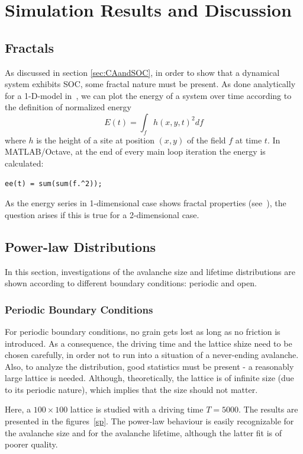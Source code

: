 \chapter{Simulation Results and Discussion}
\thispagestyle{fancy}

\section{Fractals}
As discussed in section \ref{sec:CAandSOC}, in order to show that a dynamical system exhibits SOC, some fractal nature must be present. As done analytically for a 1-D-model in~\cite{fractal_avalanching}, we can plot the energy of a system over time according to the definition of normalized energy
\[
E(t) = \int_f h(x,y,t)^2 df
\]
where $h$ is the height of a site at position $(x,y)$ of the field $f$ at time $t$. In MATLAB/Octave, at the end of every main loop iteration the energy is calculated:
\begin{lstlisting}
ee(t) = sum(sum(f.^2));
\end{lstlisting}
As the energy series in 1-dimensional case shows fractal properties (see~\cite{fractal_avalanching}), the question arises if this is true for a 2-dimensional case.

\section{Power-law Distributions}

In this section, investigations of the avalanche size and lifetime distributions are shown according to different boundary conditions: periodic and open.


\subsection{Periodic Boundary Conditions}

For periodic boundary conditions, no grain gets lost as long as no friction is introduced. As a consequence, the driving time and the lattice shize need to be chosen carefully, in order not to run into a situation of a never-ending avalanche. Also, to analyze the distribution, good statistics must be present - a reasonably large lattice is needed. Although, theoretically, the lattice is of infinite size (due to its periodic nature), which implies that the size should not matter.

Here, a $100\times 100$ lattice is studied with a driving time $T=5000$. The results are presented in the figures~\ref{sp}. The power-law behaviour is easily recognizable for the avalanche size and for the avalanche lifetime, although the latter fit is of poorer quality.

